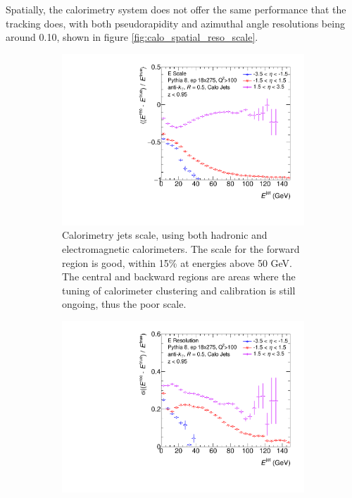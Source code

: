 Spatially, the calorimetry system does not offer the same performance that the tracking does, with both pseudorapidity and azimuthal angle resolutions being around 0.10, shown in figure \ref{fig:calo_spatial_reso_scale}.   


\begin{figure}
    \centering
    \begin{subfigure}{0.4\textwidth}
        \centering
        \includegraphics[width=\linewidth]{figs/Final_Plots/JES_calo_grouped.pdf}
        \caption{Calorimetry jets scale, using both hadronic and electromagnetic calorimeters.  The scale for the forward region is good, within 15\% at energies above 50 GeV.  The central and backward regions are areas where the tuning of calorimeter clustering and calibration is still ongoing, thus the poor scale.}
        \label{fig:calo_energy_scale}
    \end{subfigure}
    \hfill
    \begin{subfigure}{0.4\textwidth}
        \centering
        \includegraphics[width=\linewidth]{figs/Final_Plots/JER_E_calo_grouped.pdf}

\end{subfigure}
\end{figure}
